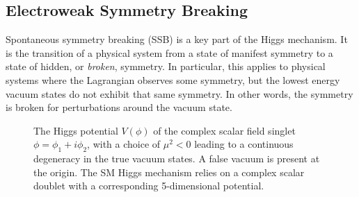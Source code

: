 \subsection{Electroweak Symmetry Breaking}\label{sec:sm_ewsb}

Spontaneous symmetry breaking (SSB) is a key part of the Higgs mechanism. It is the transition of a physical system from a state of manifest symmetry to a state of hidden, or \textit{broken}, symmetry. In particular, this applies to physical systems where the Lagrangian observes some symmetry, but the lowest energy vacuum states do not exhibit that same symmetry. In other words, the symmetry is broken for perturbations around the vacuum state.

%
\begin{figure}[!htbp]
  \centering
  
  \caption{
    The Higgs potential $V(\phi)$ of the complex scalar field singlet $\phi = \phi_1 + i \phi_2$, with a choice of $\mu^2 < 0$ leading to a continuous degeneracy in the true vacuum states. A false vacuum is present at the origin. The SM Higgs mechanism relies on a complex scalar doublet with a corresponding 5-dimensional potential.
  }
  \label{fig:higgs_potential}
\end{figure}
%

